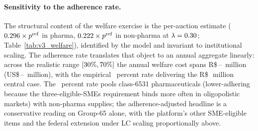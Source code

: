 \paragraph{Sensitivity to the adherence rate.}\label{sec:adherence_sensitivity} The structural content of the welfare exercise is the per-auction estimate ($0.296 \times p^{\mathrm{ref}}$ in pharma, $0.222 \times p^{\mathrm{ref}}$ in non-pharma at $\lambda = 0.30$; Table~\ref{tab:v3_welfare}), identified by the model and invariant to institutional scaling. The adherence rate translates that object to an annual aggregate linearly: across the realistic range $[30\%, 70\%]$ the annual welfare cost spans R\$\,\welfRangeLoBRL--\welfRangeHiBRL~million (US\$\,\welfRangeLoUSD--\welfRangeHiUSD~million), with the empirical \adherenceGsixtyfivePost~percent rate delivering the R\$\,\welfAnnualBRLLo~million central case. The \adherenceGsixtyfivePost~percent rate pools class-6531 pharmaceuticals (lower-adhering because the three-eligible-SMEs requirement binds more often in oligopolistic markets) with non-pharma supplies; the adherence-adjusted headline is a conservative reading on Group-65 alone, with the platform's other SME-eligible items and the federal extension under LC \leiNova{} scaling proportionally above.


